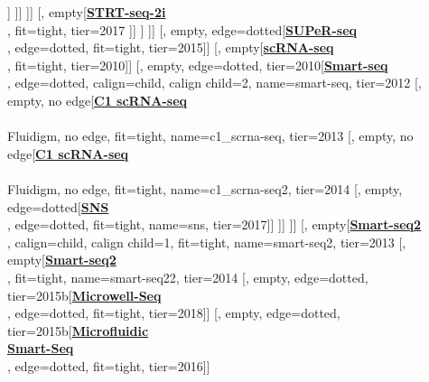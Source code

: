 \documentclass[12pt, a4]{article}
\begin{document}
\begin{center}
\begin{forest}
						[, empty[\href{https://www.nature.com/articles/s41467-018-05347-6}{\textbf{mcSCRB-seq}}\\\citealt{bagnoli2018}, fit=tight, tier=2018]]
					]]
				]]
				[, empty[\href{https://www.nature.com/articles/s41598-017-16546-4}{\textbf{STRT-seq-2i}}\\\citealt{hochgerner2017}, fit=tight, tier=2017
				]]
			]
		]]
		[, empty, edge=dotted[\href{https://genomebiology.biomedcentral.com/articles/10.1186/s13059-015-0706-1}{\textbf{SUPeR-seq}}\\\citealt{fan2015}, edge=dotted, fit=tight, tier=2015]]
		[, empty[\href{https://www.nature.com/articles/nprot.2009.236}{\textbf{scRNA-seq}}\\\citealt{tang2010}, fit=tight, tier=2010]]
		[, empty, edge=dotted, tier=2010[\href{https://www.nature.com/articles/nbt.2282}{\textbf{Smart-seq}}\\\citealt{ramskold2012}, edge=dotted, calign=child, calign child=2, name=smart-seq, tier=2012
			[, empty, no edge[\href{https://www.nature.com/articles/nmeth.2694}{\textbf{C1 scRNA-seq}}\\\citealt{wu2013}\\Fluidigm, no edge, fit=tight, name=c1_scrna-seq, tier=2013
				[, empty, no edge[\href{https://www.nature.com/articles/nbt.2967}{\textbf{C1 scRNA-seq}}\\\citealt{pollen2014}\\Fluidigm, no edge, fit=tight, name=c1_scrna-seq2, tier=2014
					[, empty, edge=dotted[\href{https://www.nature.com/articles/s41598-017-04426-w}{\textbf{SNS}}\\\citealt{lake2017}, edge=dotted, fit=tight, name=sns, tier=2017]]
					]]
			]]
			[, empty[\href{https://www.nature.com/articles/nmeth.2639}{\textbf{Smart-seq2}}\\\citealt{picelli2013}, calign=child, calign child=1, fit=tight, name=smart-seq2, tier=2013
				[, empty[\href{https://www.nature.com/articles/nprot.2014.006}{\textbf{Smart-seq2}}\\\citealt{picelli2014}, fit=tight, name=smart-seq22, tier=2014
						[, empty, edge=dotted, tier=2015b[\href{https://www.cell.com/cell/fulltext/S0092-8674(18)30116-8}{\textbf{Microwell-Seq}}\\\citealt{han2018}, edge=dotted, fit=tight, tier=2018]]
						[, empty, edge=dotted, tier=2015b[\href{https://www.nature.com/articles/ncomms10220}{\textbf{Microfluidic}}\\\href{https://www.nature.com/articles/ncomms10220}{\textbf{Smart-Seq}}\\\citealt{kimmerling2016}, edge=dotted, fit=tight, tier=2016]]

\end{forest}
\end{center}
\end{document}
